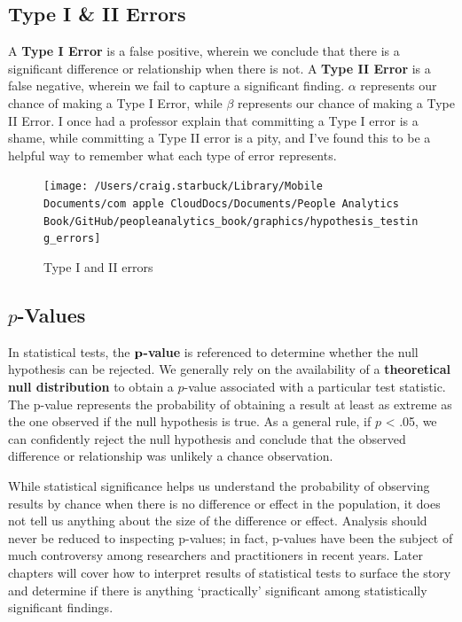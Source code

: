 \documentclass[
]{book}
\begin{document}
\hypertarget{type-i-ii-errors}{%
\subsection{Type I \& II Errors}\label{type-i-ii-errors}}

A \textbf{Type I Error} is a false positive, wherein we conclude that there is a significant difference or relationship when there is not. A \textbf{Type II Error} is a false negative, wherein we fail to capture a significant finding. \(\alpha\) represents our chance of making a Type I Error, while \(\beta\) represents our chance of making a Type II Error. I once had a professor explain that committing a Type I error is a shame, while committing a Type II error is a pity, and I've found this to be a helpful way to remember what each type of error represents.

\begin{figure}

{\centering \texttt{[image: /Users/craig.starbuck/Library/Mobile Documents/com~apple~CloudDocs/Documents/People Analytics Book/GitHub/peopleanalytics\_book/graphics/hypothesis\_testing\_errors]} 

}

\caption{Type I and II errors}\label{fig:hyp-errs}
\end{figure}

\hypertarget{p-values}{%
\subsection{\texorpdfstring{\(p\)-Values}{p-Values}}\label{p-values}}

In statistical tests, the \(\textbf p\)\textbf{-value} is referenced to determine whether the null hypothesis can be rejected. We generally rely on the availability of a \textbf{theoretical null distribution} to obtain a \(p\)-value associated with a particular test statistic. The p-value represents the probability of obtaining a result at least as extreme as the one observed if the null hypothesis is true. As a general rule, if \(p\) \textless{} .05, we can confidently reject the null hypothesis and conclude that the observed difference or relationship was unlikely a chance observation.

While statistical significance helps us understand the probability of observing results by chance when there is no difference or effect in the population, it does not tell us anything about the size of the difference or effect. Analysis should never be reduced to inspecting p-values; in fact, p-values have been the subject of much controversy among researchers and practitioners in recent years. Later chapters will cover how to interpret results of statistical tests to surface the story and determine if there is anything `practically' significant among statistically significant findings.
\end{document}
